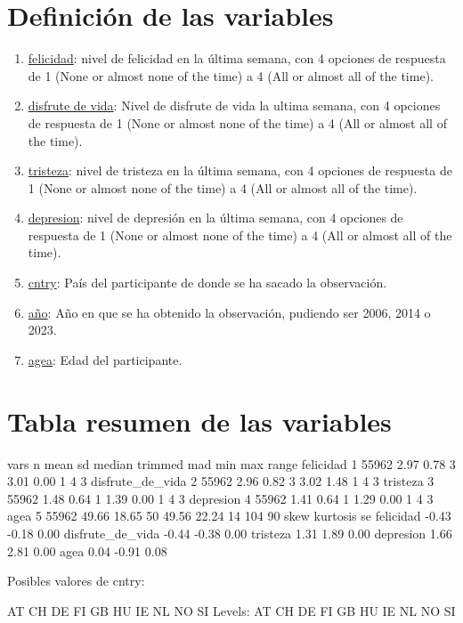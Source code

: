 \documentclass{article}
\begin{document}
\section{Definición de las variables}
\begin{enumerate}
\item \underline{felicidad}: nivel de felicidad en la última semana, con 4 opciones de respuesta de 1 (None or almost none of the time) a 4 (All or almost all of the time).

\item \underline{disfrute de vida}: Nivel de disfrute de vida la ultima semana, con 4 opciones de respuesta de 1 (None or almost none of the time) a 4 (All or almost all of the time).

\item \underline{tristeza}: nivel de tristeza en la última semana, con 4 opciones de respuesta de 1 (None or almost none of the time) a 4 (All or almost all of the time).

\item \underline{depresion}: nivel de depresión en la última semana, con 4 opciones de respuesta de 1 (None or almost none of the time) a 4 (All or almost all of the time).

\item \underline{cntry}: País del participante de donde se ha sacado la observación.

\item \underline{año}: Año en que se ha obtenido la observación, pudiendo ser 2006, 2014 o 2023.

\item \underline{agea}: Edad del participante.

\end{enumerate}



\section{Tabla resumen de las variables}


\begin{Schunk}
\begin{Soutput}
                 vars     n  mean    sd median trimmed   mad min max range
felicidad           1 55962  2.97  0.78      3    3.01  0.00   1   4     3
disfrute_de_vida    2 55962  2.96  0.82      3    3.02  1.48   1   4     3
tristeza            3 55962  1.48  0.64      1    1.39  0.00   1   4     3
depresion           4 55962  1.41  0.64      1    1.29  0.00   1   4     3
agea                5 55962 49.66 18.65     50   49.56 22.24  14 104    90
                  skew kurtosis   se
felicidad        -0.43    -0.18 0.00
disfrute_de_vida -0.44    -0.38 0.00
tristeza          1.31     1.89 0.00
depresion         1.66     2.81 0.00
agea              0.04    -0.91 0.08
\end{Soutput}
\begin{Soutput}
Posibles valores de cntry:
\end{Soutput}
\begin{Soutput}
 [1] AT CH DE FI GB HU IE NL NO SI
Levels: AT CH DE FI GB HU IE NL NO SI
\end{Soutput}
\end{Schunk}
\end{document}
